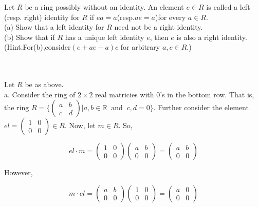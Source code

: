 Let $R$ be a ring possibly without an identity. An element $e\in R$ is called a left (resp. right)
identity for $R$ if $ea=a$(resp.$ae=a$)for every $a\in R$.\\
(a) Show that a left identity for $R$ need not be a right identity.\\
(b) Show that if $R$ has a unique left identity $e$, then $e$ is also a right identity.\\
(Hint.For(b),consider$(e+ae-a)c$ for arbitrary $a,c\in R$.)\\\\

\begin{solution}\renewcommand{\qedsymbol}{}\ \\
    Let $R$ be as above.\\

    a. Consider the ring of $2\times2$ real matricies with 0's in the bottom row. That is, the ring
    $R=\{\left(\begin{array}{cc} a & b \\ c & d \end{array}\right)|a,b\in\mathbb{R}\;\;
    \text{and}\;\;c,d=0\}$. Further consider the element
    $el=\left(\begin{array}{cc} 1 & 0 \\ 0 & 0 \end{array}\right)\in R$. Now, let $m\in R$. So,

    $$el\cdot m=\left(\begin{array}{cc} 1 & 0 \\ 0 & 0 \end{array}\right)
    \left(\begin{array}{cc} a & b \\ 0 & 0 \end{array}\right)
    =\left(\begin{array}{cc} a & b \\ 0 & 0 \end{array}\right)$$
    
    However,
    
    $$m\cdot el=\left(\begin{array}{cc} a & b \\ 0 & 0 \end{array}\right)
    \left(\begin{array}{cc} 1 & 0 \\ 0 & 0 \end{array}\right)
    =\left(\begin{array}{cc} a & 0 \\ 0 & 0 \end{array}\right)$$
    

\end{solution}

